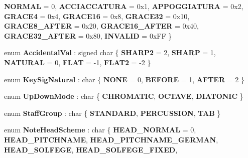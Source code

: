 \begin{DoxyCompactItemize}
{\bfseries N\+O\+R\+M\+AL} = 0, 
{\bfseries A\+C\+C\+I\+A\+C\+C\+A\+T\+U\+RA} = 0x1, 
{\bfseries A\+P\+P\+O\+G\+G\+I\+A\+T\+U\+RA} = 0x2, 
{\bfseries G\+R\+A\+C\+E4} = 0x4, 
\newline
{\bfseries G\+R\+A\+C\+E16} = 0x8, 
{\bfseries G\+R\+A\+C\+E32} = 0x10, 
{\bfseries G\+R\+A\+C\+E8\+\_\+\+A\+F\+T\+ER} = 0x20, 
{\bfseries G\+R\+A\+C\+E16\+\_\+\+A\+F\+T\+ER} = 0x40, 
\newline
{\bfseries G\+R\+A\+C\+E32\+\_\+\+A\+F\+T\+ER} = 0x80, 
{\bfseries I\+N\+V\+A\+L\+ID} = 0x\+FF
 \}
\item 
\mbox{\label{namespace_ms_ade023edbd34050dedfd725b484991e89}} 
enum {\bfseries Accidental\+Val} \+: signed char \{ \newline
{\bfseries S\+H\+A\+R\+P2} = 2, 
{\bfseries S\+H\+A\+RP} = 1, 
{\bfseries N\+A\+T\+U\+R\+AL} = 0, 
{\bfseries F\+L\+AT} = -\/1, 
\newline
{\bfseries F\+L\+A\+T2} = -\/2
 \}
\item 
\mbox{\label{namespace_ms_ae212b02f1e09f215e168254756a7d352}} 
enum {\bfseries Key\+Sig\+Natural} \+: char \{ {\bfseries N\+O\+NE} = 0, 
{\bfseries B\+E\+F\+O\+RE} = 1, 
{\bfseries A\+F\+T\+ER} = 2
 \}
\item 
\mbox{\label{namespace_ms_aa56d24b082133246f25b43b7bef7f959}} 
enum {\bfseries Up\+Down\+Mode} \+: char \{ {\bfseries C\+H\+R\+O\+M\+A\+T\+IC}, 
{\bfseries O\+C\+T\+A\+VE}, 
{\bfseries D\+I\+A\+T\+O\+N\+IC}
 \}
\item 
\mbox{\label{namespace_ms_aad3918cfddca91d981504ae55c0f19b0}} 
enum {\bfseries Staff\+Group} \+: char \{ {\bfseries S\+T\+A\+N\+D\+A\+RD}, 
{\bfseries P\+E\+R\+C\+U\+S\+S\+I\+ON}, 
{\bfseries T\+AB}
 \}
\item 
\mbox{\label{namespace_ms_a5b4a3c13732b31f8b6e8a7f8948754b9}} 
enum {\bfseries Note\+Head\+Scheme} \+: char \{ \newline
{\bfseries H\+E\+A\+D\+\_\+\+N\+O\+R\+M\+AL} = 0, 
{\bfseries H\+E\+A\+D\+\_\+\+P\+I\+T\+C\+H\+N\+A\+ME}, 
{\bfseries H\+E\+A\+D\+\_\+\+P\+I\+T\+C\+H\+N\+A\+M\+E\+\_\+\+G\+E\+R\+M\+AN}, 
{\bfseries H\+E\+A\+D\+\_\+\+S\+O\+L\+F\+E\+GE}, 
\newline
{\bfseries H\+E\+A\+D\+\_\+\+S\+O\+L\+F\+E\+G\+E\+\_\+\+F\+I\+X\+ED}, 

\end{DoxyCompactItemize}
